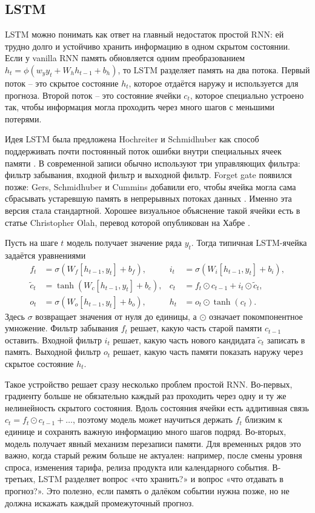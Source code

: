 \documentclass[12pt,fleqn]{article}
\begin{document}
\subsection{LSTM}

LSTM можно понимать как ответ на главный недостаток простой RNN: ей трудно долго и устойчиво хранить информацию в одном скрытом состоянии.
Если у vanilla RNN память обновляется одним преобразованием $h_t = \phi(w_y y_t + W_h h_{t-1} + b_h)$, то LSTM разделяет память на два потока.
Первый поток -- это скрытое состояние $h_t$, которое отдаётся наружу и используется для прогноза.
Второй поток -- это состояние ячейки $c_t$, которое специально устроено так, чтобы информация могла проходить через много шагов с меньшими потерями.

Идея LSTM была предложена Hochreiter и Schmidhuber как способ поддерживать почти постоянный поток ошибки внутри специальных ячеек памяти \cite{hochreiter1997}.
В современной записи обычно используют три управляющих фильтра: фильтр забывания, входной фильтр и выходной фильтр.
Forget gate появился позже: Gers, Schmidhuber и Cummins добавили его, чтобы ячейка могла сама сбрасывать устаревшую память в непрерывных потоках данных \cite{gers2000}.
Именно эта версия стала стандартной.
Хорошее визуальное объяснение такой ячейки есть в статье Christopher Olah, перевод которой опубликован на Хабре \cite{olah2017habr}.


Пусть на шаге $t$ модель получает значение ряда $y_t$.
Тогда типичная LSTM-ячейка задаётся уравнениями
\begin{align}
  f_t &= \sigma(W_f [h_{t-1}, y_t] + b_f),
  &
  i_t &= \sigma(W_i [h_{t-1}, y_t] + b_i),
  \\
  \widetilde{c}_t &= \tanh(W_c [h_{t-1}, y_t] + b_c),
  &
  c_t &= f_t \odot c_{t-1} + i_t \odot \widetilde{c}_t,
  \\
  o_t &= \sigma(W_o [h_{t-1}, y_t] + b_o),
  &
  h_t &= o_t \odot \tanh(c_t).
\end{align}
Здесь $\sigma$ возвращает значения от нуля до единицы, а $\odot$ означает покомпонентное умножение.
Фильтр забывания $f_t$ решает, какую часть старой памяти $c_{t-1}$ оставить.
Входной фильтр $i_t$ решает, какую часть нового кандидата $\widetilde{c}_t$ записать в память.
Выходной фильтр $o_t$ решает, какую часть памяти показать наружу через скрытое состояние $h_t$.


Такое устройство решает сразу несколько проблем простой RNN.
Во-первых, градиенту больше не обязательно каждый раз проходить через одну и ту же нелинейность скрытого состояния.
Вдоль состояния ячейки есть аддитивная связь $c_t = f_t \odot c_{t-1} + \ldots$, поэтому модель может научиться держать $f_t$ близким к единице и сохранять важную информацию много шагов подряд.
Во-вторых, модель получает явный механизм перезаписи памяти.
Для временных рядов это важно, когда старый режим больше не актуален: например, после смены уровня спроса, изменения тарифа, релиза продукта или календарного события.
В-третьих, LSTM разделяет вопрос «что хранить?» и вопрос «что отдавать в прогноз?».
Это полезно, если память о далёком событии нужна позже, но не должна искажать каждый промежуточный прогноз.
\end{document}
